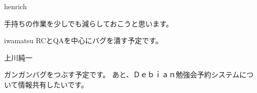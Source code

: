 \begin{prework}{ henrich }

手持ちの作業を少しでも減らしておこうと思います。

\end{prework}



\begin{prework}{ iwamatsu }
RCとQAを中心にバグを潰す予定です。


\end{prework}



\begin{prework}{ 上川純一 }

ガンガンバグをつぶす予定です。
あと、Ｄｅｂｉａｎ勉強会予約システムについて情報共有したいです。

\end{prework}
